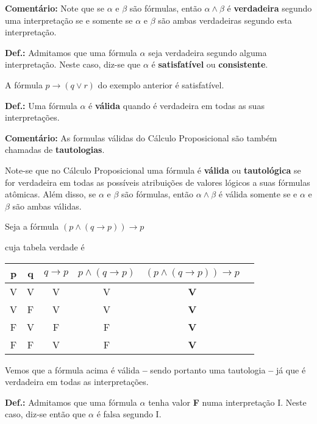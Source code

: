 \bigskip
\noindent
\textbf{Comentário:} Note que se $\alpha$ e $\beta$ são fórmulas, então $\alpha \land \beta$ é \textbf{verdadeira} segundo uma interpretação se e somente se $\alpha$ e $\beta$ são ambas verdadeiras segundo esta interpretação.

\bigskip
\noindent
\textbf{Def.:} Admitamos que uma fórmula $\alpha$ seja verdadeira segundo alguma interpretação.
Neste caso, diz-se que $\alpha$ é \textbf{satisfatível} ou \textbf{consistente}.

A fórmula $p \to (q \lor r)$ do exemplo anterior é satisfatível.


\bigskip
\noindent
\textbf{Def.:} Uma fórmula $\alpha$ é \textbf{válida} quando é verdadeira em todas as suas interpretações.

\bigskip
\noindent
\textbf{Comentário:} As formulas válidas do Cálculo Proposicional são também chamadas de \textbf{tautologias}.

Note-se que no Cálculo Proposicional uma fórmula é \textbf{válida} ou \textbf{tautológica} se for verdadeira em todas as possíveis atribuições de valores lógicos a suas fórmulas atômicas.
Além disso, se $\alpha$ e $\beta$ são fórmulas, então $\alpha \land \beta$ é válida somente se e $\alpha$ e $\beta$ são ambas válidas.

\begin{exemplo}
    Seja a fórmula $(p \land (q \to p)) \to p$
\end{exemplo}
\noindent cuja tabela verdade é

\begin{center}
    \begin{tabular}{c c c c c c}
        p & q & $q \to p$ & $p \land (q \to p)$ & $(p \land (q \to p)) \to p$ \\ \hline
        V & V & V         & V                   & \textbf{V} \\
        V & F & V         & V                   & \textbf{V} \\
        F & V & F         & F                   & \textbf{V} \\
        F & F & V         & F                   & \textbf{V}
    \end{tabular}
\end{center}
Vemos que a fórmula acima é válida \textbf{--} sendo portanto uma tautologia \textbf{--} já que é verdadeira em todas as interpretações.

\bigskip
\noindent
\textbf{Def.:} Admitamos que uma fórmula $\alpha$ tenha valor \textbf{F} numa interpretação I.
Neste caso, diz-se então que $\alpha$ é falsa segundo I.

